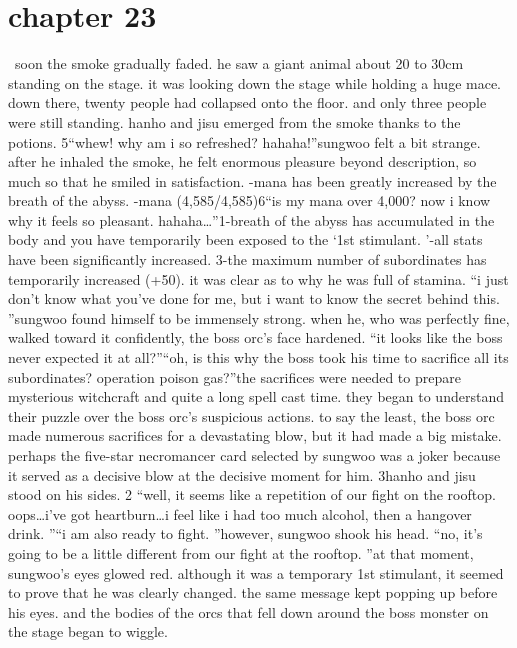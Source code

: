\section{chapter 23}






 soon the smoke gradually faded.
he saw a giant animal about 20 to 30cm standing on the stage.
 it was looking down the stage while holding a huge mace.
 down there, twenty people had collapsed onto the floor.
 and only three people were still standing.
 hanho and jisu emerged from the smoke thanks to the potions.
5“whew! why am i so refreshed? hahaha!”sungwoo felt a bit strange.
 after he inhaled the smoke, he felt enormous pleasure beyond description, so much so that he smiled in satisfaction.
-mana has been greatly increased by the breath of the abyss.
-mana (4,585/4,585)6“is my mana over 4,000? now i know why it feels so pleasant.
 hahaha…”1-breath of the abyss has accumulated in the body and you have temporarily been exposed to the ‘1st stimulant.
’-all stats have been significantly increased.
3-the maximum number of subordinates has temporarily increased (+50).
it was clear as to why he was full of stamina.
“i just don’t know what you’ve done for me, but i want to know the secret behind this.
”sungwoo found himself to be immensely strong.
when he, who was perfectly fine, walked toward it confidently, the boss orc’s face hardened.
“it looks like the boss never expected it at all?”“oh, is this why the boss took his time to sacrifice all its subordinates? operation poison gas?”the sacrifices were needed to prepare mysterious witchcraft and quite a long spell cast time.
they began to understand their puzzle over the boss orc’s suspicious actions.
 to say the least, the boss orc made numerous sacrifices for a devastating blow, but it had made a big mistake.
perhaps the five-star necromancer card selected by sungwoo was a joker because it served as a decisive blow at the decisive moment for him.
3hanho and jisu stood on his sides.
2
“well, it seems like a repetition of our fight on the rooftop.
 oops…i’ve got heartburn…i feel like i had too much alcohol, then a hangover drink.
”“i am also ready to fight.
”however, sungwoo shook his head.
“no, it’s going to be a little different from our fight at the rooftop.
”at that moment, sungwoo’s eyes glowed red.
 although it was a temporary 1st stimulant, it seemed to prove that he was clearly changed.
the same message kept popping up before his eyes.
and the bodies of the orcs that fell down around the boss monster on the stage began to wiggle.
